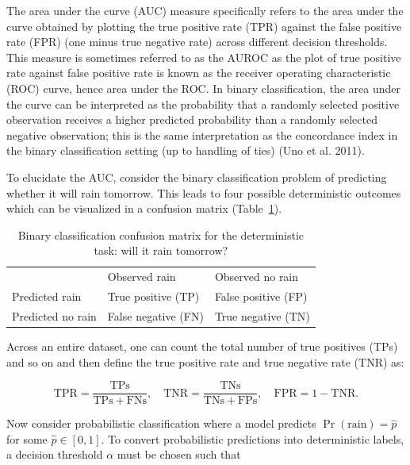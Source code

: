 \documentclass[
  letterpaper,
  krantz2]{style/krantz}
\begin{document}
The area under the curve (AUC) measure
specifically refers to the area under the curve obtained by plotting the
true positive rate (TPR) against the false
positive rate (FPR) (one minus true negative
rate) across different decision thresholds.
This measure is sometimes referred to as the AUROC as the plot of true
positive rate against false positive rate is known as the receiver
operating characteristic (ROC) curve, hence area under the ROC. In
binary classification, the area under the
curve can be interpreted as the probability that a randomly selected
positive observation receives a higher predicted probability than a
randomly selected negative
observation; this is the
same interpretation as the concordance index in
the binary classification setting (up to handling of ties) (Uno et al.
2011).

To elucidate the AUC, consider the binary classification problem of
predicting whether it will rain tomorrow. This leads to four possible
deterministic outcomes which can be visualized in a confusion
matrix (Table~\ref{tbl-confusion-classif}).

\begin{longtable}[]{@{}lll@{}}
\caption{Binary classification confusion matrix for the deterministic
task: will it rain
tomorrow?}\label{tbl-confusion-classif}\tabularnewline
\toprule\noalign{}
\endfirsthead
\endhead
\bottomrule\noalign{}
\endlastfoot
& Observed rain & Observed no rain \\
Predicted rain & True positive (TP) & False positive (FP) \\
Predicted no rain & False negative (FN) & True negative (TN) \\
\end{longtable}

Across an entire dataset, one can count the total number of true
positives (TPs) and so on and then define the true
positive rate and true negative rate (TNR) as:

\[
\mathrm{TPR} = \frac{\mathrm{TPs}}{\mathrm{TPs} + \mathrm{FNs}}, \quad \mathrm{TNR} = \frac{\mathrm{TNs}}{\mathrm{TNs} + \mathrm{FPs}}, \quad \mathrm{FPR} = 1 - \mathrm{TNR}.
\]

Now consider probabilistic classification where a model predicts
\(\Pr(\mathrm{rain}) = \hat{p}\) for some \(\hat{p} \in [0,1]\). To
convert probabilistic predictions
into deterministic labels, a decision threshold \(\alpha\) must be
chosen such that
\end{document}
